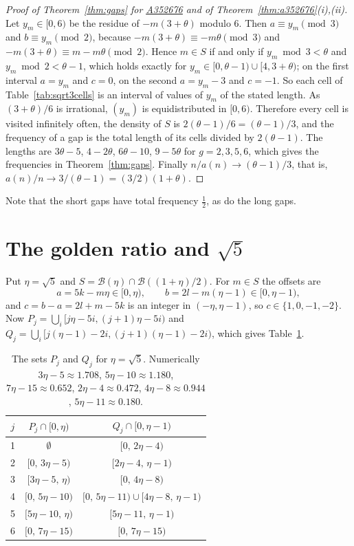 \documentclass[12pt]{article}
\newcommand{\seqnum}[1]{\href{https://oeis.org/#1}{\underline{#1}}}
\newcommand{\B}{\mathcal{B}}
\theoremstyle{plain}
\theoremstyle{remark}
\begin{document}
\begin{proof}[Proof of Theorem~\ref{thm:gaps} for \seqnum{A352676} and of
Theorem~\ref{thm:a352676}(i),(ii)]
Let $y_m\in[0,6)$ be the residue of $-m(3+\theta)$ modulo $6$. Then $a\equiv y_m\pmod 3$ and
$b\equiv y_m\pmod 2$, because $-m(3+\theta)\equiv-m\theta\pmod3$ and
$-m(3+\theta)\equiv m-m\theta\pmod 2$. Hence $m\in S$ if and only if $y_m\bmod 3<\theta$ and
$y_m\bmod 2<\theta-1$, which holds exactly for $y_m\in[0,\theta-1)\cup[4,3+\theta)$; on the
first interval $a=y_m$ and $c=0$, on the second $a=y_m-3$ and $c=-1$. So each cell of
Table~\ref{tab:sqrt3cells} is an interval of values of $y_m$ of the stated length. As
$(3+\theta)/6$ is irrational, $(y_m)$ is equidistributed in $[0,6)$. Therefore every cell is
visited infinitely often, the density of $S$ is $2(\theta-1)/6=(\theta-1)/3$, and the
frequency of a gap is the total length of its cells divided by $2(\theta-1)$. The lengths are
$3\theta-5$, $4-2\theta$, $6\theta-10$, $9-5\theta$ for $g=2,3,5,6$, which gives the
frequencies in Theorem~\ref{thm:gaps}. Finally $n/a(n)\to(\theta-1)/3$, that is,
$a(n)/n\to3/(\theta-1)=(3/2)(1+\theta)$.
\end{proof}

Note that the short gaps have total frequency $\frac12$, as do the long gaps.

\section{The golden ratio and \texorpdfstring{$\sqrt5$}{sqrt 5}}\label{sec:golden}

Put $\eta=\sqrt5$ and $S=\B(\eta)\cap\B((1+\eta)/2)$. For $m\in S$ the offsets are
\[
a=5k-m\eta\in[0,\eta),\qquad b=2l-m(\eta-1)\in[0,\eta-1),
\]
and $c=b-a=2l+m-5k$ is an integer in $(-\eta,\eta-1)$, so $c\in\{1,0,-1,-2\}$. Now
$P_j=\bigcup_i[j\eta-5i,(j+1)\eta-5i)$ and $Q_j=\bigcup_i[j(\eta-1)-2i,(j+1)(\eta-1)-2i)$,
which gives Table~\ref{tab:goldenPQ}.

\begin{table}[ht]
\centering
\begin{tabular}{ccc}
\toprule
$j$ & $P_j\cap[0,\eta)$ & $Q_j\cap[0,\eta-1)$\\
\midrule
1 & $\emptyset$ & $[0,\,2\eta-4)$\\
2 & $[0,\,3\eta-5)$ & $[2\eta-4,\,\eta-1)$\\
3 & $[3\eta-5,\,\eta)$ & $[0,\,4\eta-8)$\\
4 & $[0,\,5\eta-10)$ & $[0,\,5\eta-11)\cup[4\eta-8,\,\eta-1)$\\
5 & $[5\eta-10,\,\eta)$ & $[5\eta-11,\,\eta-1)$\\
6 & $[0,\,7\eta-15)$ & $[0,\,7\eta-15)$\\
\bottomrule
\end{tabular}
\caption{The sets $P_j$ and $Q_j$ for $\eta=\sqrt5$. Numerically $3\eta-5\approx1.708$,
$5\eta-10\approx1.180$, $7\eta-15\approx0.652$, $2\eta-4\approx0.472$, $4\eta-8\approx0.944$,
$5\eta-11\approx0.180$.}\label{tab:goldenPQ}
\end{table}
\end{document}
